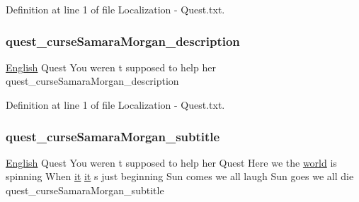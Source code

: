 Definition at line 1 of file Localization -\/ Quest.\+txt.

\mbox{\label{_the_01_restless_01_curse_2_config_2_localization_01-_01_quest_8txt_a7d6c124c385a41af5a0664c7a53e8c3c}} 
\subsubsection{\texorpdfstring{quest\_curseSamaraMorgan\_description}{quest\_curseSamaraMorgan\_description}}
{\footnotesize\ttfamily \mbox{\hyperlink{_sphere_i_i_01_winter_01_project_2_config_2_localization_8txt_ad896b63205779b1b09e86d941ce13976}{English}} Quest You weren t supposed to help her quest\+\_\+curse\+Samara\+Morgan\+\_\+description}



Definition at line 1 of file Localization -\/ Quest.\+txt.

\mbox{\label{_the_01_restless_01_curse_2_config_2_localization_01-_01_quest_8txt_ad2bd800d9ce8d3038f15e70dbdf01b6e}} 
\subsubsection{\texorpdfstring{quest\_curseSamaraMorgan\_subtitle}{quest\_curseSamaraMorgan\_subtitle}}
{\footnotesize\ttfamily \mbox{\hyperlink{_sphere_i_i_01_winter_01_project_2_config_2_localization_8txt_ad896b63205779b1b09e86d941ce13976}{English}} Quest You weren t supposed to help her Quest Here we the \mbox{\hyperlink{_sphere_i_i_01_music_01_boxes_2_config_2_localization_8txt_a7ede01351426b1b7f6c1ce5f794e474f}{world}} is spinning When \mbox{\hyperlink{_the_01_restless_01_curse_2_config_2_localization_01-_01_quest_8txt_a741b285909bea4855b886664c2dcd50c}{it}} \mbox{\hyperlink{_the_01_restless_01_curse_2_config_2_localization_01-_01_quest_8txt_a741b285909bea4855b886664c2dcd50c}{it}} s just beginning Sun comes we all laugh Sun goes we all die quest\+\_\+curse\+Samara\+Morgan\+\_\+subtitle}



